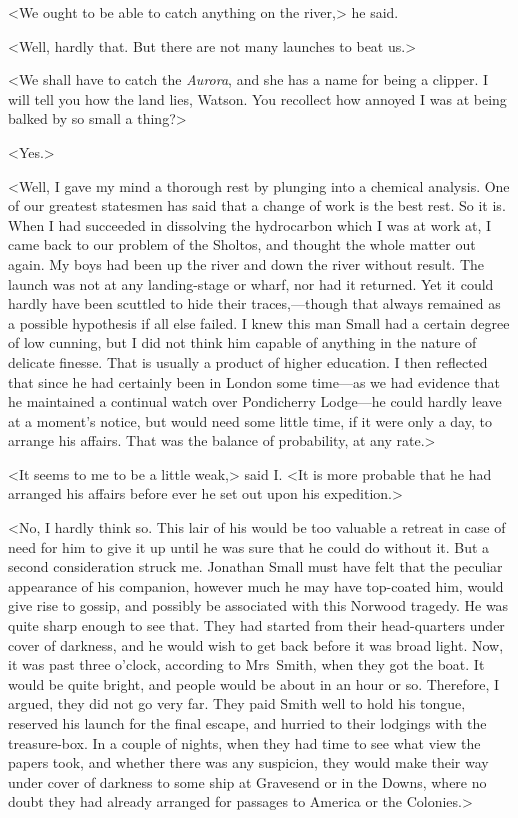 <We ought to be able to catch anything on the river,> he said.

<Well, hardly that. But there are not many launches to beat us.>

<We shall have to catch the \textit{Aurora}, and she has a name for being a clipper. I will tell you how the land lies, Watson. You recollect how annoyed I was at being balked by so small a thing?>

<Yes.>

<Well, I gave my mind a thorough rest by plunging into a chemical analysis. One of our greatest statesmen has said that a change of work is the best rest. So it is. When I had succeeded in dissolving the hydrocarbon which I was at work at, I came back to our problem of the Sholtos, and thought the whole matter out again. My boys had been up the river and down the river without result. The launch was not at any landing-stage or wharf, nor had it returned. Yet it could hardly have been scuttled to hide their traces,—though that always remained as a possible hypothesis if all else failed. I knew this man Small had a certain degree of low cunning, but I did not think him capable of anything in the nature of delicate finesse. That is usually a product of higher education. I then reflected that since he had certainly been in London some time—as we had evidence that he maintained a continual watch over Pondicherry Lodge—he could hardly leave at a moment's notice, but would need some little time, if it were only a day, to arrange his affairs. That was the balance of probability, at any rate.>

<It seems to me to be a little weak,> said I\@. <It is more probable that he had arranged his affairs before ever he set out upon his expedition.>

<No, I hardly think so. This lair of his would be too valuable a retreat in case of need for him to give it up until he was sure that he could do without it. But a second consideration struck me. Jonathan Small must have felt that the peculiar appearance of his companion, however much he may have top-coated him, would give rise to gossip, and possibly be associated with this Norwood tragedy. He was quite sharp enough to see that. They had started from their head-quarters under cover of darkness, and he would wish to get back before it was broad light. Now, it was past three o'clock, according to Mrs~Smith, when they got the boat. It would be quite bright, and people would be about in an hour or so. Therefore, I argued, they did not go very far. They paid Smith well to hold his tongue, reserved his launch for the final escape, and hurried to their lodgings with the treasure-box. In a couple of nights, when they had time to see what view the papers took, and whether there was any suspicion, they would make their way under cover of darkness to some ship at Gravesend or in the Downs, where no doubt they had already arranged for passages to America or the Colonies.>

